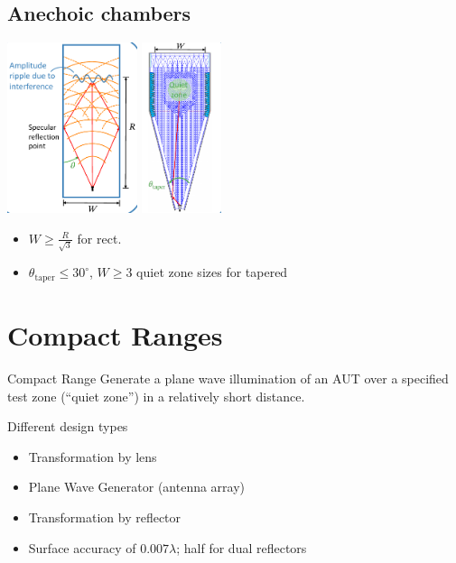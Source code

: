 \subsection{Anechoic chambers}
\includegraphics[height=5cm]{content/at_meas/pictures/rectangular_anechoic_chamber}
\includegraphics[height=5cm]{content/at_meas/pictures/tapered_anechoic_chamber}
\begin{itemize}
  \item $W \geq \frac{R}{\sqrt{3}}$ for rect.
        \item $\theta_{\text{taper}} \leq 30^{\circ}$, $W \geq 3$ quiet zone sizes for tapered
\end{itemize}

\section{Compact Ranges}
\begin{definition}{Compact Range}
  Generate a plane wave illumination of an AUT over a specified test zone (``quiet zone'') in a relatively short distance.
\end{definition}
Different design types
\begin{itemize}
  \item Transformation by lens
  \item Plane Wave Generator (antenna array)
  \item Transformation by reflector
  \item Surface accuracy of $0.007\lambda$; half for dual reflectors
\end{itemize}

